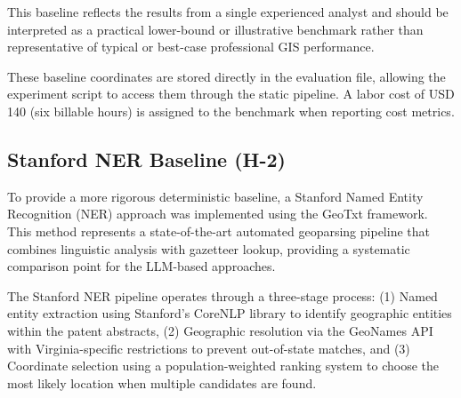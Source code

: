 This baseline reflects the results from a single experienced analyst and
should be interpreted as a practical lower-bound or illustrative
benchmark rather than representative of typical or best-case
professional GIS performance.

These baseline coordinates are stored directly in the evaluation file,
allowing the experiment script to access them through the static
pipeline. A labor cost of USD 140 (six billable hours) is assigned to
the benchmark when reporting cost metrics.

\DIFaddbegin {}

\subsection{}\label{county-centroid-baseline-h-4}


\DIFaddend \subsection{Stanford NER Baseline
(H-2)}\label{stanford-ner-baseline-h-2}

To provide a more rigorous deterministic baseline, a Stanford Named
Entity Recognition (NER) approach was implemented using the GeoTxt
framework. This method represents a state-of-the-art automated
geoparsing pipeline that combines linguistic analysis with gazetteer
lookup, providing a systematic comparison point for the LLM-based
approaches.

The Stanford NER pipeline operates through a three-stage process: (1)
Named entity extraction using Stanford's CoreNLP library to identify
geographic entities within the patent abstracts, (2) Geographic
resolution via the GeoNames API with Virginia-specific restrictions to
prevent out-of-state matches, and (3) Coordinate selection using a
population-weighted ranking system to choose the most likely location
when multiple candidates are found.

